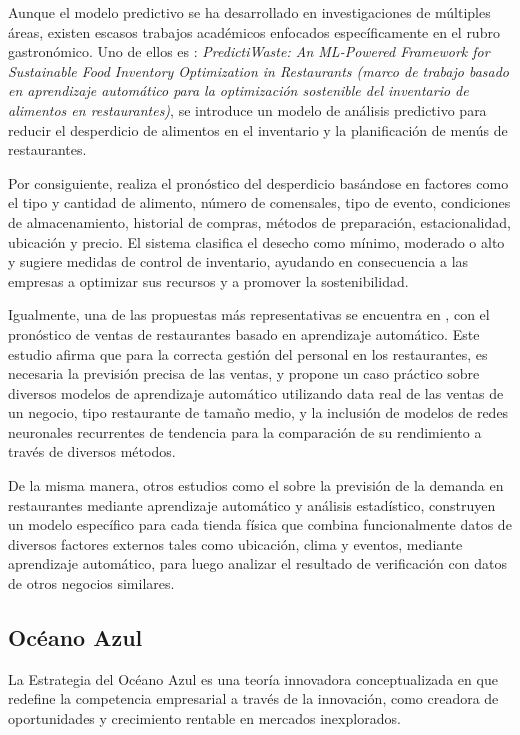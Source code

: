 Aunque el modelo predictivo se ha desarrollado en investigaciones de múltiples áreas, existen escasos trabajos académicos enfocados específicamente en el rubro gastronómico. Uno de ellos es \parencite{hari2024predictiwaste}: \emph{PredictiWaste: An ML-Powered Framework for Sustainable Food Inventory Optimization in Restaurants (marco de trabajo basado en aprendizaje automático para la optimización sostenible del inventario de alimentos en restaurantes)}, se introduce un modelo de análisis predictivo para reducir el desperdicio de alimentos en el inventario y la planificación de menús de restaurantes. 

Por consiguiente, realiza el pronóstico del desperdicio basándose en factores como el tipo y cantidad de alimento, número de comensales, tipo de evento, condiciones de almacenamiento, historial de compras, métodos de preparación, estacionalidad, ubicación y precio. El sistema clasifica el desecho como mínimo, moderado o alto y sugiere medidas de control de inventario, ayudando en consecuencia a las empresas a optimizar sus recursos y a promover la sostenibilidad. 

Igualmente, una de las propuestas más representativas se encuentra en \parencite{schmidt2022mlsales}, con el pronóstico de ventas de restaurantes basado en aprendizaje automático. Este estudio afirma que para la correcta gestión del personal en los restaurantes, es necesaria la previsión precisa de las ventas, y propone un caso práctico sobre diversos modelos de aprendizaje automático utilizando data real de las ventas de un negocio, tipo restaurante de tamaño medio, y la inclusión de modelos de redes neuronales recurrentes de tendencia para la comparación de su rendimiento a través de diversos métodos.

De la misma manera, otros estudios como el \parencite{tanizaki2019forecasting} sobre la previsión de la demanda en restaurantes mediante aprendizaje automático y análisis estadístico, construyen un modelo específico para cada tienda física que combina funcionalmente datos de diversos factores externos tales como ubicación, clima y eventos, mediante aprendizaje automático, para luego analizar el resultado de verificación con datos de otros negocios similares.

\subsection{Océano Azul}

La Estrategia del Océano Azul es una teoría innovadora conceptualizada en \parencite{kim2015estrategia} que redefine la competencia empresarial a través de la innovación, como creadora de oportunidades y crecimiento rentable en mercados inexplorados.

